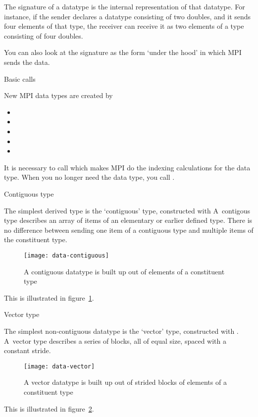 The signature of a datatype is the internal representation of that
datatype. For instance, if the sender declares a datatype consisting
of two doubles, and it sends four elements of that type, the receiver
can receive it as two elements of a type consisting of four doubles.

You can also look at the signature as the form `under the hood' in which MPI
sends the data.


 {Basic calls}

New MPI data types are created by
\begin{itemize}
\item {}
\item {}
\item {}
\item {}
\item {}
\end{itemize}
It is necessary to call  which makes MPI
do the indexing calculations for the data type.  When you no longer
need the data type, you call .

 {Contiguous type}

The simplest derived type is the `contiguous' type,
constructed with 
A~contigous type describes an array of items
of an elementary or earlier defined type. There is no difference between sending
one item of a contiguous type and multiple items of the constituent type.
\begin{figure}[ht]
  \texttt{[image: data-contiguous]}
  \caption{A contiguous datatype is built up out of elements of a constituent type}
  \label{fig:data-contiguous}
\end{figure}
This is illustrated in figure~\ref{fig:data-contiguous}.

 {Vector type}

The simplest non-contiguous datatype is the `vector' type, constructed with
. A~vector type describes a series of blocks, all 
of equal size, spaced with a constant stride.
\begin{figure}[ht]
  \texttt{[image: data-vector]}
  \caption{A vector datatype is built up out of strided blocks of elements of a constituent type}
  \label{fig:data-vector}
\end{figure}
This is illustrated in figure~\ref{fig:data-vector}.

